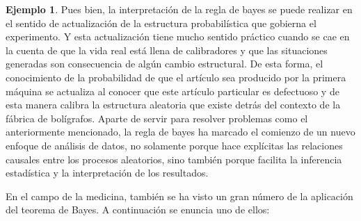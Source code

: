 \documentclass[
  10pt,
  spanish,
]{book}
\theoremstyle{definition}
\theoremstyle{definition}
\newtheorem{example}{Ejemplo}[chapter]
\theoremstyle{definition}
\theoremstyle{definition}
\theoremstyle{remark}
\begin{document}
\begin{example}
Pues bien, la interpretación de la regla de bayes se puede realizar en el sentido de actualización de la estructura probabilística que gobierna el experimento. Y esta actualización tiene mucho sentido práctico cuando se cae en la cuenta de que la vida real está llena de calibradores y que las situaciones generadas son consecuencia de algún cambio estructural. De esta forma, el conocimiento de la probabilidad de que el artículo sea producido por la primera máquina se actualiza al conocer que este artículo particular es defectuoso y de esta manera calibra la estructura aleatoria que existe detrás del contexto de la fábrica de bolígrafos. Aparte de servir para resolver problemas como el anteriormente mencionado, la regla de bayes ha marcado el comienzo de un nuevo enfoque de análisis de datos, no solamente porque hace explícitas las relaciones causales entre los procesos aleatorios, sino también porque facilita la inferencia estadística y la interpretación de los resultados.
\end{example}

En el campo de la medicina, también se ha visto un gran número de la
aplicación del teorema de Bayes. A continuación se enuncia uno de ellos:
\end{document}
